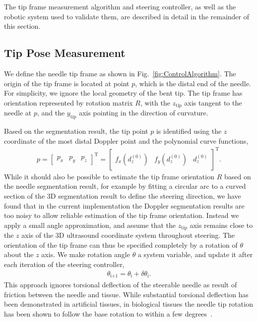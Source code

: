 The tip frame measurement algorithm and steering controller, as well as the robotic system used to validate them, are described in detail in the remainder of this section. 

\subsection{Tip Pose Measurement}
We define the needle tip frame as shown in Fig.~\ref{fig:ControlAlgorithm}. The origin of the tip frame is located at point ${p}$, which is the distal end of the needle. For simplicity, we ignore the local geometry of the bent tip. The tip frame has orientation represented by rotation matrix $R$, with the $z_{\text{tip}}$ axis tangent to the needle at ${p}$, and the $y_{\text{tip}}$ axis pointing in the direction of curvature.


Based on the segmentation result, the tip point ${p}$ is identified using the $z$ coordinate of the most distal Doppler point and the polynomial curve functions,
\begin{align}
{p} = \begin{bmatrix}p_x & p_y & p_z\end{bmatrix}^{\text{T}} = \begin{bmatrix}f_x(d^{(0)}_z) & f_y(d^{(0)}_z) & d^{(0)}_z \end{bmatrix}^{\text{T}}.
\end{align}
While it should also be possible to estimate the tip frame orientation $R$ based on the needle segmentation result, for example by fitting a circular arc to a curved section of the 3D segmentation result to define the steering direction, we have found that in the current implementation the Doppler segmentation results are too noisy to allow reliable estimation of the tip frame orientation. Instead we apply a small angle approximation, and assume that the $z_{\text{tip}}$ axis remains close to the $z$ axis of the 3D ultrasound coordinate system throughout steering. The orientation of the tip frame can thus be specified completely by a rotation of $\theta$ about the $z$ axis. We make rotation angle $\theta$ a system variable, and update it after each iteration of the steering controller, 
\begin{align}
\theta_\text{i+1} = \theta_\text{i} + \delta\theta_\text{i}.
\end{align}
This approach ignores torsional deflection of the steerable needle as result of friction between the needle and tissue. While substantial torsional deflection has been demonstrated in artificial tissues, in biological tissues the needle tip rotation has been shown to follow the base rotation to within a few degrees~\cite{Reed2008}. 

